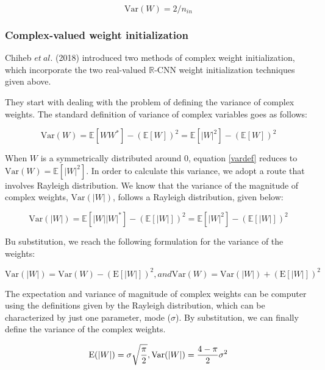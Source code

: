 \begin{equation}\label{hewi}
 \mathrm{Var}(W) = 2/n_{in}
 \end{equation}
 \subsubsection{Complex-valued weight initialization}\label{cwi}
 Chiheb $et \ al.$ (2018) introduced two methods of complex weight initialization, which incorporate the two real-valued $\mathbb{R}$-CNN weight initialization techniques given above.
 
 They start with dealing with the problem of defining the variance of complex weights. The standard definition of variance of complex variables goes as follows:
 
 \begin{equation}\label{vardef}
 \mathrm{Var}(W) = \mathbb{E}[WW^{*}]-(\mathbb{E}[W])^2 = \mathbb{E}[|W|^{2}]-(\mathbb{E}[W])^2
 \end{equation}
 
 
 When $W$ is a symmetrically distributed around 0, equation \ref{vardef} reduces to $\mathrm{Var}(W) = \mathbb{E}[|W|^{2}]$. In order to calculate this variance, we adopt a route that involves Rayleigh distribution. We know that the variance of the magnitude of complex weights, $\mathrm{Var}(|W|)$, follows a Rayleigh distribution, given below:
 
 \begin{equation}\label{varmagrayleighdef}
 \mathrm{Var}(|W|) = \mathbb{E}[|W||W|^{*}]-(\mathbb{E}[|W|])^2 = \mathbb{E}[|W|^{2}]-(\mathbb{E}[|W|])^2
 \end{equation}
 
 Bu substitution, we reach the following formulation for the variance of the weights:
 
 \begin{equation}\label{varw2}
 \mathrm{Var}(|W|) = \mathrm{Var}(W)-(\mathrm{E}[|W|])^2 , and  
 \mathrm{Var}(W) = \mathrm{Var}(|W|) + (\mathrm{E}[|W|])^2
 \end{equation}
  
 The expectation and variance of magnitude of complex weights can be computer using the definitions given by the Rayleigh distribution, which can be characterized by just one parameter, mode ($\sigma$). By substitution, we can finally define the variance of the complex weights.
 
 \begin{equation}\label{ray1}
 \mathrm{E}(|W|) = \sigma\sqrt{\frac{\pi}{2}},\\  
 \mathrm{Var}(|W|) = \frac{4-\pi}{2}\sigma^{2}
 \end{equation}
 
